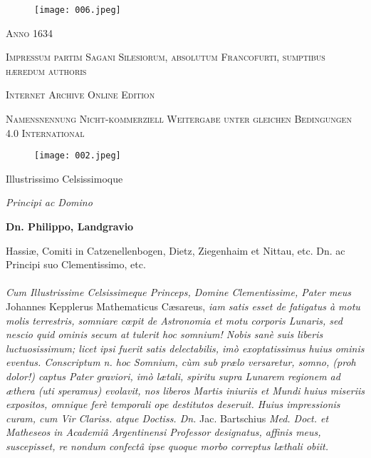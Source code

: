 \documentclass[a4paper, 11pt, oneside, polutonikogreek, german]{article}
\begin{document}
\begin{titlepage}
        \vspace*{\fill}

        \begin{figure}[H]
        \centering
        \texttt{[image: 006.jpeg]}
        \end{figure}

	\vspace{1\baselineskip}

	{\small\scshape Anno 1634}
	
	{\small\scshape{Impressum partim Sagani Silesiorum, absolutum Francofurti, sumptibus hæredum authoris}}
	
	\vspace{0.5\baselineskip} %

        \scshape Internet Archive Online Edition%
    
	{\scshape\small Namensnennung Nicht-kommerziell Weitergabe unter gleichen Bedingungen 4.0 International} %
\end{titlepage}
\setlength{\parskip}{1mm plus1mm minus1mm}
\clearpage
\begin{figure}[H]
\centering
\texttt{[image: 002.jpeg]}
\end{figure}
\begin{center}
Illustrissimo Celsissimoque

\emph{Principi ac Domino}

\textbf{Dn. Philippo, Landgravio}

{\small Hassiæ, Comiti in Catzenellenbogen, Dietz, Ziegenhaim et Nittau, etc. Dn. ac Principi suo Clementissimo, etc.}
\end{center}
\paragraph{}
\emph{Cum Illustrissime Celsissimeque Princeps, Domine Clementissime, Pater meus} Johannes Kepplerus Mathematicus Cæsareus, \emph{iam satis esset de fatigatus à motu molis terrestris, somniare cœpit de Astronomia et motu corporis Lunaris, sed nescio quid ominis secum at tulerit hoc somnium! Nobis sanè suis liberis luctuosissimum; licet ipsi fuerit satis delectabilis, imò exoptatissimus huius ominis eventus. Conscriptum n. hoc Somnium, cùm sub prælo versaretur, somno, (proh dolor!) captus Pater graviori, imò lætali, spiritu supra Lunarem regionem ad æthera (uti speramus) evolavit, nos liberos Martis iniuriis et Mundi huius miseriis expositos, omnique ferè temporali ope destitutos deseruit. Huius impressionis curam, cum Vir Clariss. atque Doctiss. Dn.} Jac. Bartschius \emph{Med. Doct. et Matheseos in Academiâ Argentinensi Professor designatus, affinis meus, suscepisset, re nondum confectâ ipse quoque morbo correptus læthali obiit.}
\end{document}
